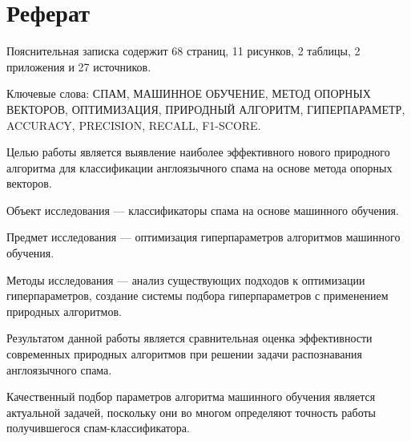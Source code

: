 \chapter*{Реферат}
\thispagestyle{plain}
Пояснительная записка содержит 68 страниц, 11 рисунков, 2 таблицы, 2 приложения и 27 источников.

Ключевые слова: СПАМ, МАШИННОЕ ОБУЧЕНИЕ, МЕТОД ОПОРНЫХ ВЕКТОРОВ, ОПТИМИЗАЦИЯ, 
ПРИРОДНЫЙ АЛГОРИТМ, ГИПЕРПАРАМЕТР, ACCURACY, PRECISION, RECALL, F1-SCORE.

Целью работы является выявление наиболее эффективного нового природного алгоритма 
для классификации англоязычного спама на основе метода опорных векторов. 

Объект исследования — классификаторы спама на основе машинного обучения. 

Предмет исследования — оптимизация гиперпараметров алгоритмов машинного обучения.

Методы исследования — анализ существующих подходов к оптимизации гиперпараметров, 
создание системы подбора гиперпараметров с применением природных алгоритмов.

Результатом данной работы является сравнительная оценка эффективности современных 
природных алгоритмов при решении задачи распознавания англоязычного спама.

Качественный подбор параметров алгоритма машинного обучения является актуальной задачей, 
поскольку они во многом определяют точность работы получившегося спам-классификатора.